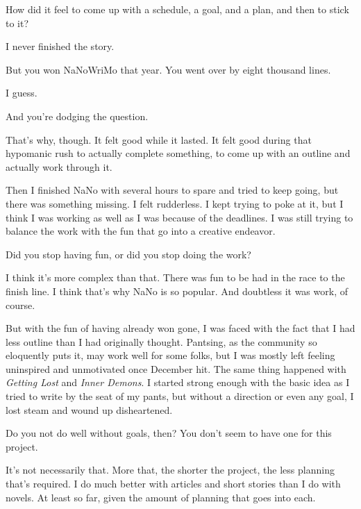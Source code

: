 \begin{paracol}{2}
\begin{leftcolumn}
\begin{ally}
How did it feel to come up with a schedule, a goal, and a plan, and then to stick to it?
\end{ally}
I never finished the story.

\begin{ally}
But you won NaNoWriMo that year. You went over by eight thousand lines.
\end{ally}
I guess.

\begin{ally}
And you're dodging the question.
\end{ally}
That's why, though. It felt good while it lasted. It felt good during that hypomanic rush to actually complete something, to come up with an outline and actually work through it.

Then I finished NaNo with several hours to spare and tried to keep going, but there was something missing. I felt rudderless. I kept trying to poke at it, but I think I was working as well as I was because of the deadlines. I was still trying to balance the work with the fun that go into a creative endeavor.

\begin{ally}
Did you stop having fun, or did you stop doing the work?
\end{ally}
I think it's more complex than that. There was fun to be had in the race to the finish line. I think that's why NaNo is so popular. And doubtless it was work, of course.

But with the fun of having already won gone, I was faced with the fact that I had less outline than I had originally thought. Pantsing, as the community so eloquently puts it, may work well for some folks, but I was mostly left feeling uninspired and unmotivated once December hit. The same thing happened with \emph{Getting Lost} and \emph{Inner Demons}. I started strong enough with the basic idea as I tried to write by the seat of my pants, but without a direction or even any goal, I lost steam and wound up disheartened.

\begin{ally}
Do you not do well without goals, then? You don't seem to have one for this project.
\end{ally}
It's not necessarily that. More that, the shorter the project, the less planning that's required. I do much better with articles and short stories than I do with novels. At least so far, given the amount of planning that goes into each.


\end{leftcolumn}
\end{paracol}
